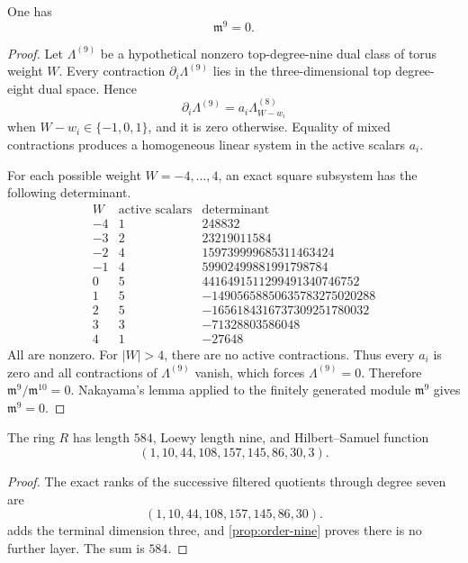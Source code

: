 \documentclass[11pt,reqno]{amsart}
\begin{document}
\begin{proposition}
\label{prop:order-nine}
One has
\[
\mathfrak m^9=0.
\]
\end{proposition}

\begin{proof}
Let \(\Lambda^{(9)}\) be a hypothetical nonzero top-degree-nine dual class of
torus weight \(W\).  Every contraction \(\partial_i\Lambda^{(9)}\) lies in the
three-dimensional top degree-eight dual space.  Hence
\[
\partial_i\Lambda^{(9)}
=a_i\Lambda_{W-w_i}^{(8)}
\]
when \(W-w_i\in\{-1,0,1\}\), and it is zero otherwise.  Equality of mixed
contractions produces a homogeneous linear system in the active scalars
\(a_i\).

For each possible weight \(W=-4,\ldots,4\), an exact square subsystem has the
following determinant.
\[
\begin{array}{c|r|r}
W&\text{active scalars}&\text{determinant}\\ \hline
-4&1&248832\\
-3&2&23219011584\\
-2&4&159739999685311463424\\
-1&4&59902499881991798784\\
0&5&4416491511299491340746752\\
1&5&-14905658850635783275020288\\
2&5&-1656184316737309251780032\\
3&3&-71328803586048\\
4&1&-27648
\end{array}
\]
All are nonzero.  For \(|W|>4\), there are no active contractions.  Thus every
\(a_i\) is zero and all contractions of \(\Lambda^{(9)}\) vanish, which forces
\(\Lambda^{(9)}=0\).  Therefore
\(\mathfrak m^9/\mathfrak m^{10}=0\).  Nakayama's lemma applied to the
finitely generated module \(\mathfrak m^9\) gives \(\mathfrak m^9=0\).
\end{proof}

\begin{corollary}
\label{cor:hilbert}
The ring \(R\) has length \(584\), Loewy length nine, and Hilbert--Samuel
function
\[
(1,10,44,108,157,145,86,30,3).
\]
\end{corollary}

\begin{proof}
The exact ranks of the successive filtered quotients through degree seven are
\[
(1,10,44,108,157,145,86,30).
\]
 adds the terminal dimension three, and
\cref{prop:order-nine} proves there is no further layer.  The sum is \(584\).
\end{proof}
\end{document}
